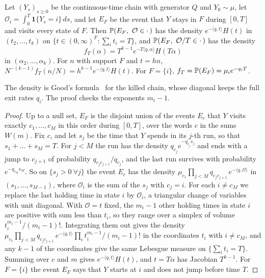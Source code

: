 \begin{lemma}\label{lem:continuum}
Let $(Y_s)_{s\ge0}$ be the continuous-time chain with generator $Q$ and
$Y_0\sim\mu$, let $\mathcal O_i=\int_0^T\mathbf 1\{Y_s=i\}\,ds$, and let $E_F$
be the event that $Y$ stays in $F$ during $[0,T]$ and visits every state of $F$.
Then $\mathbb{P}(E_F,\ \mathcal O\in\cdot\,)$ has the density
$e^{-\langle q,t\rangle}H(t)$ in $(t_2,\dots,t_k)$ on
$\{t\in(0,\infty)^F:\sum_it_i=T\}$, and $\mathbb{P}(E_F,\ \mathcal O/T\in\cdot\,)$
has the density
\[
f_T(\alpha)=T^{k-1}e^{-T\langle q,\alpha\rangle}H(T\alpha)
\]
in $(\alpha_2,\dots,\alpha_k)$. For $n$ with support $F$ and $t=hn$,
$N^{-(k-1)}f_T(n/N)=h^{k-1}e^{-\langle q,t\rangle}H(t)$. For $F=\{i\}$,
$f_T=\mathbb{P}(E_F)=\mu_ie^{-q_iT}$.
\end{lemma}

The density is Good's formula~\cite[(10)]{good1961} for the killed chain,
whose diagonal keeps the full exit rates $q_i$. The proof checks the exponents
$m_i-1$.

\begin{proof}
Up to a null set, $E_F$ is the disjoint union of the events $E_c$ that $Y$
visits exactly $c_1,\dots,c_M$ in this order during $[0,T]$, over the words $c$
in the sums $W(m)$. Fix $c$, and let $s_j$ be the time that $Y$ spends in its
$j$-th run, so that $s_1+\dots+s_M=T$. For $j<M$ the run has the density
$q_{c_j}e^{-q_{c_j}s_j}$ and ends with a jump to $c_{j+1}$ of probability
$q_{c_jc_{j+1}}/q_{c_j}$, and the last run survives with probability
$e^{-q_{c_M}s_M}$. So on $\{s_j>0\ \forall j\}$ the event $E_c$ has the density
$\mu_{c_1}\prod_{j<M}q_{c_jc_{j+1}}\,e^{-\langle q,\mathcal O\rangle}$ in
$(s_1,\dots,s_{M-1})$, where $\mathcal O_i$ is the sum of the $s_j$ with $c_j=i$.
For each $i\ne c_M$ we replace the last holding time in state $i$ by
$\mathcal O_i$, a triangular change of variables with unit diagonal. With
$\mathcal O=t$ fixed, the $m_i-1$ other holding times in state $i$ are positive
with sum less than $t_i$, so they range over a simplex of volume
$t_i^{m_i-1}/(m_i-1)!$. Integrating them out gives the density
$\mu_{c_1}\prod_{j<M}q_{c_jc_{j+1}}\,e^{-\langle q,t\rangle}\prod_it_i^{m_i-1}/(m_i-1)!$
in the coordinates $t_i$ with $i\ne c_M$, and any $k-1$ of the coordinates give
the same Lebesgue measure on $\{\sum_it_i=T\}$. Summing over $c$ and $m$ gives
$e^{-\langle q,t\rangle}H(t)$, and $t=T\alpha$ has Jacobian $T^{k-1}$. For
$F=\{i\}$ the event $E_F$ says that $Y$ starts at $i$ and does not jump before
time $T$.
\end{proof}

